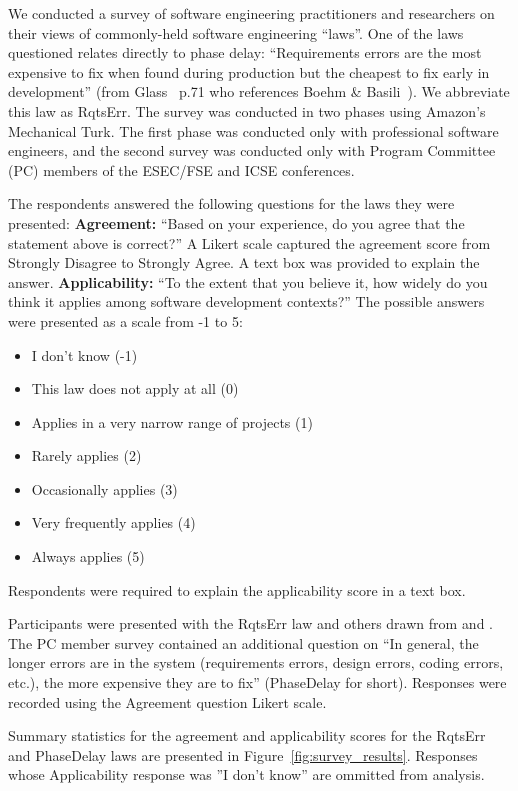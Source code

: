 We conducted a survey of software engineering practitioners and researchers on their views of commonly-held software engineering ``laws''. One of the laws questioned relates directly to phase delay: ``Requirements errors are the most expensive to fix when found during production but the cheapest to fix early in development'' (from Glass~\cite{glass02} p.71 who references Boehm \& Basili~\cite{boehm01}). We abbreviate this law as RqtsErr. The survey was conducted in two phases using Amazon's Mechanical Turk. The first phase was conducted only with professional software engineers, and the second survey was conducted only with Program Committee (PC) members of the ESEC/FSE and ICSE conferences.

The respondents answered the following questions for the laws they were presented: \newline
\textbf{Agreement:} ``Based on your experience, do you agree that the statement above is correct?'' A Likert scale captured the agreement score from Strongly Disagree to Strongly Agree. A text box was provided to explain the answer. \newline
\textbf{Applicability:} ``To the extent that you believe it, how widely do you think it applies among software development contexts?'' The possible answers were presented as a scale from -1 to 5:
\begin{itemize}
\item I don't know (-1)
\item This law does not apply at all (0)
\item Applies in a very narrow range of projects  (1)
\item Rarely applies (2)
\item Occasionally applies (3)
\item Very frequently applies (4)
\item Always applies (5)
\end{itemize}
Respondents were required to explain the applicability score in a text box.

Participants were presented with the RqtsErr law and others drawn from \cite{glass02} and \cite{endres03}. The PC member survey contained an additional question on ``In general, the longer errors are in the system (requirements errors, design errors, coding errors, etc.), the more expensive they are to fix'' (PhaseDelay for short). Responses were recorded using the Agreement question Likert scale. 

Summary statistics for the agreement and applicability scores for the RqtsErr and PhaseDelay laws are presented in Figure~\ref{fig:survey_results}. Responses whose Applicability response was ''I don't know'' are ommitted from analysis.


